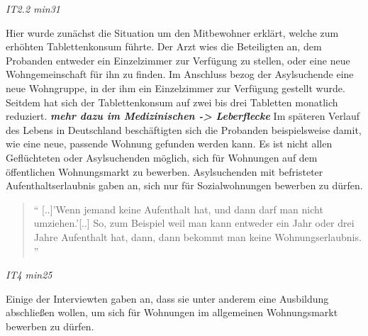 \centerline{\textit{IT2.2 min31}}
Hier wurde zunächst die Situation um den Mitbewohner erklärt, welche zum erhöhten Tablettenkonsum führte. Der Arzt wies die Beteiligten an, dem Probanden entweder ein Einzelzimmer zur Verfügung zu stellen, oder eine neue Wohngemeinschaft für ihn zu finden.\newline
Im Anschluss bezog der Asylsuchende eine neue Wohngruppe, in der ihm ein Einzelzimmer zur Verfügung gestellt wurde. Seitdem hat sich der Tablettenkonsum auf zwei bis drei Tabletten monatlich reduziert. \textit{\textbf{mehr dazu im Medizinischen -> Leberflecke}}\newline
Im späteren Verlauf des Lebens in Deutschland beschäftigten sich die Probanden beispielsweise damit, wie eine neue, passende Wohnung gefunden werden kann.\newline 
Es ist nicht allen Geflüchteten oder Asylsuchenden möglich, sich für Wohnungen auf dem öffentlichen Wohnungsmarkt zu bewerben. Asylsuchenden mit befristeter Aufenthaltserlaubnis gaben an, sich nur für Sozialwohnungen bewerben zu dürfen.
\begin{quote}
    `` [..]'Wenn jemand keine Aufenthalt hat, und dann darf man nicht umziehen.'[..] So, zum Beispiel weil man kann entweder ein Jahr oder drei Jahre Aufenthalt hat, dann, dann bekommt man keine Wohnungserlaubnis. ''
\end{quote}
\centerline{\textit{IT4 min25}}
Einige der Interviewten gaben an, dass sie unter anderem eine Ausbildung abschließen wollen, um sich für Wohnungen im allgemeinen Wohnungsmarkt bewerben zu dürfen.\newline